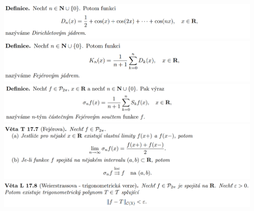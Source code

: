 \documentclass[12pt,a4paper]{article}
\begin{document}
\begin{center}
		\includegraphics[width=\textwidth]{img/4four/2020-06-21 11 45 52.png}\vspace{0.3cm}
		\includegraphics[width=\textwidth]{img/4four/2020-06-21 11 49 12.png}\vspace{0.3cm}
		\includegraphics[width=\textwidth]{img/4four/2020-06-21 11 49 28.png}\vspace{0.3cm}
		\includegraphics[width=\textwidth]{img/4four/2020-06-21 11 49 36.png}\vspace{0.3cm}
		\includegraphics[width=\textwidth]{img/4four/2020-06-21 13 21 23.png}\vspace{0.3cm}
	\end{center}
	
\end{document}
